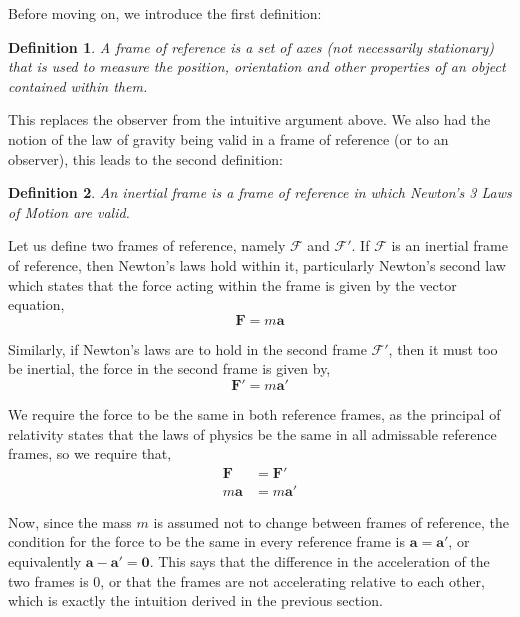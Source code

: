 \documentclass[a4paper,12pt,draft]{report}
\newtheorem{definition}{Definition}
\begin{document}
Before moving on, we introduce the first definition:

\begin{definition} A frame of reference is a set of axes (not necessarily stationary) that is used to measure the position, orientation and other properties of an object contained within them.
\end{definition}

This replaces the observer from the intuitive argument above. We also had the notion of the law of gravity being valid in a frame of reference (or to an observer), this leads to the second definition:

\begin{definition}
An inertial frame is a frame of reference in which Newton's 3 Laws of Motion are valid.
\end{definition}

Let us define two frames of reference, namely $\mathcal{F}$ and $\mathcal{F'}$. If $\mathcal{F}$ is an inertial frame of reference, then Newton's laws hold within it, particularly Newton's second law which states that the force acting within the frame is given by the vector equation,
$$
\pmb{F} = m\pmb{a}
$$

Similarly, if Newton's laws are to hold in the second frame $\mathcal{F'}$, then it must too be inertial, the force in the second frame is given by,
$$
\pmb{F'} = m\pmb{a'}
$$

We require the force to be the same in both reference frames, as the principal of relativity states that the laws of physics be the same in all admissable reference frames, so we require that,
$$
\begin{aligned}
\pmb{F} & = \pmb{F'}\\
m\pmb{a} & = m\pmb{a'}
\end{aligned}
$$

Now, since the mass $m$ is assumed not to change between frames of reference, the condition for the force to be the same in every reference frame is $\pmb{a} = \pmb{a'}$, or equivalently $\pmb{a} - \pmb{a'} = \pmb{0}$. This says that the difference in the acceleration of the two frames is $0$, or that the frames are not accelerating relative to each other, which is exactly the intuition derived in the previous section.
\end{document}
